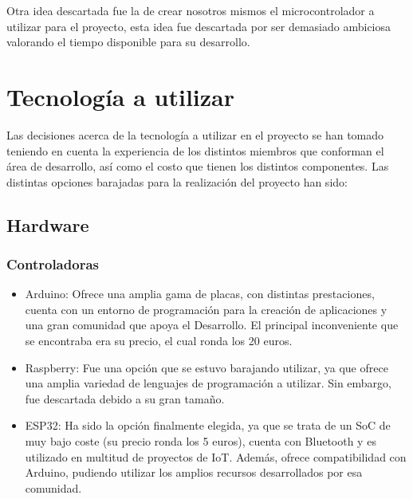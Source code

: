 \documentclass[runningheads]{llncs}
\begin{document}
Otra idea descartada fue la de crear nosotros mismos el microcontrolador
a utilizar para el proyecto, esta idea fue descartada por ser demasiado
ambiciosa valorando el tiempo disponible para su desarrollo.

\section{Tecnología a utilizar}
Las decisiones acerca de la tecnología a utilizar en el proyecto se han
tomado teniendo en cuenta la experiencia de los distintos miembros que
conforman el área de desarrollo, así como el costo que tienen los
distintos componentes.
\newline
Las distintas opciones barajadas para la realización del proyecto han
sido:

\subsection*{Hardware}
\subsubsection*{Controladoras}
\begin{itemize}
    \item Arduino: Ofrece una amplia gama de placas, con distintas
    prestaciones, cuenta con un entorno de programación para la creación
    de aplicaciones y una gran comunidad que apoya el Desarrollo. El
    principal inconveniente que se encontraba era su precio, el cual
    ronda los 20 euros.
    
    \item Raspberry: Fue una opción que se estuvo barajando utilizar, ya
    que ofrece una amplia variedad de lenguajes de programación a
    utilizar. Sin embargo, fue descartada debido a su gran tamaño.
    
    
    \item ESP32: Ha sido la opción finalmente elegida, ya que se trata
    de un SoC de muy bajo coste (su precio ronda los 5 euros), cuenta
    con Bluetooth y es utilizado en multitud de proyectos de IoT.
    Además, ofrece compatibilidad con Arduino, pudiendo utilizar los
    amplios recursos desarrollados por esa comunidad.
    
    \end{itemize}
\end{document}
